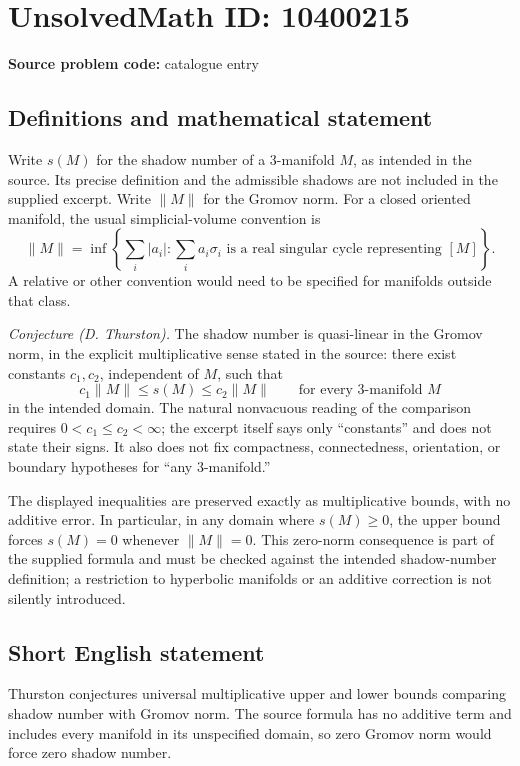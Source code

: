 \documentclass[11pt]{article}
\begin{document}
\section*{UnsolvedMath ID: 10400215}
\textbf{Source problem code:} catalogue entry
\subsection{Definitions and mathematical statement}
Write \(s(M)\) for the shadow number of a \(3\)-manifold \(M\), as intended in the source. Its precise definition and the admissible shadows are not included in the supplied excerpt. Write \(\|M\|\) for the Gromov norm. For a closed oriented manifold, the usual simplicial-volume convention is
\[
 \|M\|=\inf\left\{\sum_i|a_i|:
 \sum_i a_i\sigma_i\text{ is a real singular cycle representing }[M]\right\}.
\]
A relative or other convention would need to be specified for manifolds outside that class.

\emph{Conjecture (D. Thurston).} The shadow number is quasi-linear in the Gromov norm, in the explicit multiplicative sense stated in the source: there exist constants \(c_1,c_2\), independent of \(M\), such that
\[
 c_1\|M\|\leq s(M)\leq c_2\|M\|
 \qquad\text{for every }3\text{-manifold }M
\]
in the intended domain. The natural nonvacuous reading of the comparison requires \(0<c_1\leq c_2<\infty\); the excerpt itself says only ``constants'' and does not state their signs. It also does not fix compactness, connectedness, orientation, or boundary hypotheses for ``any \(3\)-manifold.''

The displayed inequalities are preserved exactly as multiplicative bounds, with no additive error. In particular, in any domain where \(s(M)\geq0\), the upper bound forces \(s(M)=0\) whenever \(\|M\|=0\). This zero-norm consequence is part of the supplied formula and must be checked against the intended shadow-number definition; a restriction to hyperbolic manifolds or an additive correction is not silently introduced.
\subsection{Short English statement}
Thurston conjectures universal multiplicative upper and lower bounds comparing shadow number with Gromov norm. The source formula has no additive term and includes every manifold in its unspecified domain, so zero Gromov norm would force zero shadow number.
\end{document}
